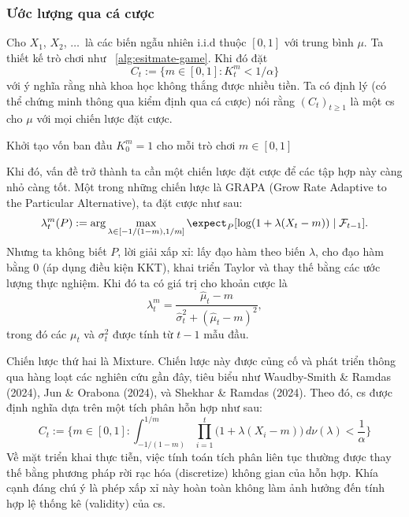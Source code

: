 \subsubsection{Ước lượng qua cá cược}

Cho $X_1$, $X_2$, $\ldots\,$ là các biến ngẫu nhiên i.i.d thuộc $[0, 1]$ với
trung bình $\mu$. Ta thiết kế trò chơi như
\algorithmname~\ref{alg:esitmate-game}. Khi đó đặt \begin{equation}
  C_t := \{ m \in [0, 1]: K^m_t < 1/\alpha \}
\end{equation} với ý nghĩa rằng nhà khoa học không thắng được nhiều tiền. Ta
có định lý (có thể chứng minh thông qua kiểm định qua cá cược) nói rằng
$(C_t)_{t \ge 1}$ là một \gls{cs} cho $\mu$ với mọi chiến lược đặt
cược.

\begin{algorithm}[htbp]
  \caption{Ước lượng qua cá cược}
  \label{alg:esitmate-game}

  Khởi tạo vốn ban đầu $K^m_0 = 1$ cho mỗi trò chơi $m \in [0, 1]$\;

\end{algorithm}

Khi đó, vấn đề trở thành ta cần một chiến lược đặt cược để các tập hợp này càng
nhỏ càng tốt. Một trong những chiến lược là GRAPA (Grow Rate Adaptive to the
Particular Alternative), ta đặt cược như sau: \begin{equation}
  \lambda^m_t(P) := \arg\max_{\lambda \in [-1/(1 - m), 1/m]} \expect_P[\log(1 +
  \lambda(X_t - m)) \mid \mathcal{F}_{t - 1}].
\end{equation} Nhưng ta không biết $P$, lời giải xấp xỉ: lấy đạo hàm theo biến
$\lambda$, cho đạo hàm bằng 0 (áp dụng điều kiện KKT), khai triển Taylor và
thay thế bằng các ước lượng thực nghiệm. Khi đó ta có giá trị cho khoản cược là
\begin{equation}
  \lambda^m_t = \frac{\hat\mu_t - m}{ \hat\sigma_t^2 + (\hat\mu_t - m)^2 },
\end{equation} trong đó các $\mu_t$ và $\sigma_t^2$ được tính từ $t - 1$ mẫu
đầu.

Chiến lược thứ hai là Mixture. Chiến lược này được củng cố và phát triển thông
qua hàng loạt các nghiên cứu gần đây, tiêu biểu như Waudby-Smith \& Ramdas
(2024), Jun \& Orabona (2024), và Shekhar \& Ramdas (2024). Theo đó, \gls{cs}
được định nghĩa dựa trên một tích phân hỗn hợp như sau:
\begin{equation}
  C_t := \Biggl\{ m \in [0,1] : \int_{-1/(1-m)}^{1/m} \prod_{i=1}^t \big(1 +
  \lambda(X_i - m)\big) \, d\nu(\lambda) < \frac{1}{\alpha} \Biggr\}
\end{equation} Về mặt triển khai thực tiễn, việc tính toán tích phân liên tục
thường được thay thế bằng phương pháp rời rạc hóa (discretize) không gian của
hỗn hợp. Khía cạnh đáng chú ý là phép xấp xỉ này hoàn toàn không làm ảnh hưởng
đến tính hợp lệ thống kê (validity) của \gls{cs}.

